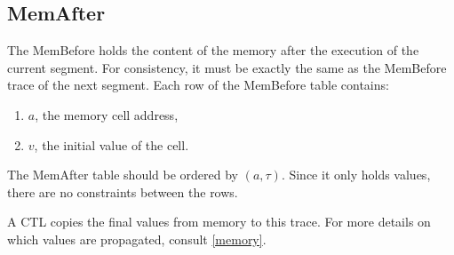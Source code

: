 \subsection{MemAfter}
\label{mem-after}

The MemBefore holds the content of the memory after the execution of the current segment. For consistency, it must be exactly the same as the MemBefore trace
of the next segment.
Each row of the MemBefore table contains:

\begin{enumerate}
  \item $a$, the memory cell address,
  \item $v$, the initial value of the cell.
\end{enumerate}
The MemAfter table should be ordered by $(a, \tau)$. Since it only holds values, there are no constraints between the rows.

A CTL copies the final values from memory to this trace. For more details on which values are propagated, consult \ref{memory}.